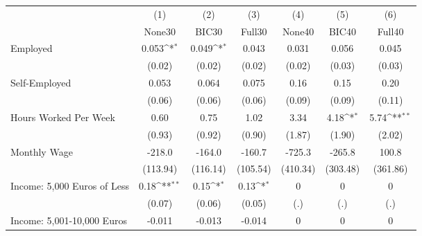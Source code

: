 {
\def\sym#1{\ifmmode^{#1}\else\(^{#1}\)\fi}
\begin{tabular}{l*{6}{c}}
\toprule
            &\multicolumn{1}{c}{(1)}&\multicolumn{1}{c}{(2)}&\multicolumn{1}{c}{(3)}&\multicolumn{1}{c}{(4)}&\multicolumn{1}{c}{(5)}&\multicolumn{1}{c}{(6)}\\
            &\multicolumn{1}{c}{None30}&\multicolumn{1}{c}{BIC30}&\multicolumn{1}{c}{Full30}&\multicolumn{1}{c}{None40}&\multicolumn{1}{c}{BIC40}&\multicolumn{1}{c}{Full40}\\
\midrule
Employed    &       0.053\sym{*}  &       0.049\sym{*}  &       0.043         &       0.031         &       0.056         &       0.045         \\
            &      (0.02)         &      (0.02)         &      (0.02)         &      (0.02)         &      (0.03)         &      (0.03)         \\
\addlinespace
Self-Employed&       0.053         &       0.064         &       0.075         &        0.16         &        0.15         &        0.20         \\
            &      (0.06)         &      (0.06)         &      (0.06)         &      (0.09)         &      (0.09)         &      (0.11)         \\
\addlinespace
Hours Worked Per Week&        0.60         &        0.75         &        1.02         &        3.34         &        4.18\sym{*}  &        5.74\sym{**} \\
            &      (0.93)         &      (0.92)         &      (0.90)         &      (1.87)         &      (1.90)         &      (2.02)         \\
\addlinespace
Monthly Wage&      -218.0         &      -164.0         &      -160.7         &      -725.3         &      -265.8         &       100.8         \\
            &    (113.94)         &    (116.14)         &    (105.54)         &    (410.34)         &    (303.48)         &    (361.86)         \\
\addlinespace
Income: 5,000 Euros of Less&        0.18\sym{**} &        0.15\sym{*}  &        0.13\sym{*}  &           0         &           0         &           0         \\
            &      (0.07)         &      (0.06)         &      (0.05)         &         (.)         &         (.)         &         (.)         \\
\addlinespace
Income: 5,001-10,000 Euros&      -0.011         &      -0.013         &      -0.014         &           0         &           0         &           0         \\

\end{tabular}}
